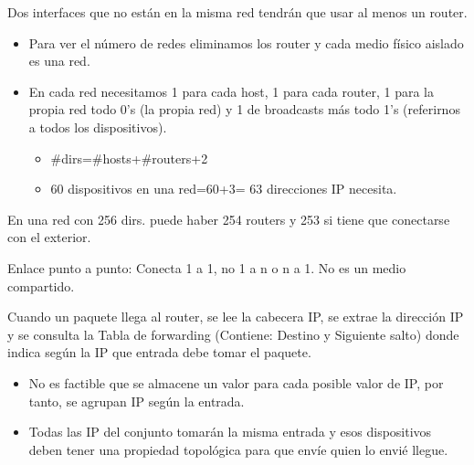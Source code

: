 \documentclass[12pt, twoside, openright]{report} %
\begin{document}
Dos interfaces que no están en la misma red tendrán que usar al
menos un router.

\begin{itemize}
	\item Para ver el número de redes eliminamos los router y cada medio
	      físico aislado es una red.
	\item En cada red necesitamos 1 para cada host, 1 para cada router, 1
	      para la propia red todo 0's (la propia red) y 1 de broadcasts más
	      todo 1's (referirnos a todos los dispositivos).

	      \begin{itemize}
		      \item \#dirs=\#hosts+\#routers+2
		      \item 60 dispositivos en una red=60+3= 63 direcciones IP necesita.
	      \end{itemize}
\end{itemize}

En una red con 256 dirs. puede haber 254 routers y 253 si tiene que
conectarse con el exterior.

Enlace punto a punto: Conecta 1 a 1, no 1 a n o n a 1. No es un
medio compartido.

Cuando un paquete llega al router, se lee la cabecera IP, se extrae
la dirección IP y se consulta la Tabla de forwarding (Contiene:
Destino y Siguiente salto) donde indica según la IP que entrada debe
tomar el paquete.

\begin{itemize}
	\item No es factible que se almacene un valor para cada posible valor de
	      IP, por tanto, se agrupan IP según la entrada.
	\item Todas las IP del conjunto tomarán la misma entrada y esos
	      dispositivos deben tener una propiedad topológica para que envíe quien
	      lo envié llegue.
\end{itemize}
\end{document}
